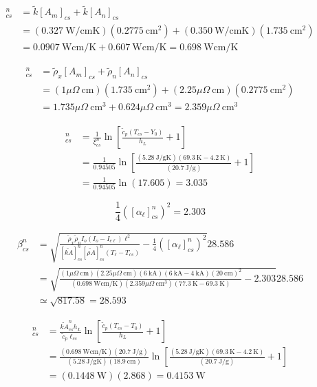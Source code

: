 \begin{align}%
[\tilde{kA}]_{cs}^{n}&=\tilde{k}[A_m]_{cs}+\tilde{k}[A_n]_{cs} \\
&=(0.327\ \mathrm{W/cmK})(0.2775\ \mathrm{cm^2})+(0.350\ \mathrm{W/cmK})(1.735\ \mathrm{cm^2}) \\
&=0.0907\ \mathrm{W cm/K}+0.607\ \mathrm{W cm/K}=0.698\ \mathrm{W cm/K}
\end{align}

\begin{align}%
[\tilde{\rho A}]_{cs}^{n}&=\tilde{\rho}_x[A_m]_{cs}+\tilde{\rho}_n[A_n]_{cs} \\
&=(1\mu\Omega\ \mathrm{cm})(1.735\ \mathrm{cm^2})+(2.25\mu\Omega\ \mathrm{cm})(0.2775\ \mathrm{cm^2}) \\
&=1.735\mu\Omega\ \mathrm{cm^3}+0.624\mu\Omega\ \mathrm{cm^3}=2.359\mu\Omega\ \mathrm{cm^3}
\end{align}

\begin{align}%
[\alpha_\ell]_{cs}^{n}&=\frac{1}{\xi_{cs}^{n}}\ln\left[\frac{\tilde{c}_p(T_{cs}-Y_0)}{h_L}+1\right] \\
&=\frac{1}{0.94505}\ln\left[\frac{(5.28\ \mathrm{J/gK})(69.3\ \mathrm{K}-4.2\ \mathrm{K})}{(20.7\ \mathrm{J/g})}+1\right] \\
&=\frac{1}{0.94505}\ln(17.605)=3.035
\end{align}

\begin{equation}
\frac{1}{4}([\alpha_\ell]_{cs}^{n})^2=2.303
\end{equation}

\begin{align}%
\beta_{cs}^{n}&=\sqrt{\frac{\tilde{\rho}_x\tilde{\rho}_nI_o(I_o-I_{c\ell})\ell^2}{[\tilde{kA}]_{cs}^{n}[\tilde{\rho A}]_{cs}^{n}(T_\ell-T_{cs})}-\frac{1}{4}([\alpha_\ell]_{cs}^{n})^2}
28.586\\
&=\sqrt{\frac{(1\mu\Omega\ \mathrm{cm})(2.25\mu\Omega\ \mathrm{cm})(6\ \mathrm{kA})(6\ \mathrm{kA}-4\ \mathrm{kA})(20\ \mathrm{cm})^2}{(0.698\ \mathrm{W cm/K})(2.359\mu\Omega\ \mathrm{cm^3})(77.3\ \mathrm{K}-69.3\ \mathrm{K})}-2.303}
28.586\\
&\simeq\sqrt{817.58}=28.593
\end{align}

\begin{align}%
[Q_{in}]_{cs}^{n}&=\frac{\tilde{kA}_{cs}^{n}h_L}{\tilde{c}_p\ell_{cs}}\ln\left[\frac{\tilde{c}_p(T_{cs}-T_0)}{h_L}+1\right] \\
&=\frac{(0.698\ \mathrm{W cm/K})(20.7\ \mathrm{J/g})}{(5.28\ \mathrm{J/gK})(18.9\ \mathrm{cm})}\ln\left[\frac{(5.28\ \mathrm{J/gK})(69.3\ \mathrm{K}-4.2\ \mathrm{K})}{(20.7\ \mathrm{J/g})}+1\right] \\
&=(0.1448\ \mathrm{W})(2.868)=0.4153\ \mathrm{W}
\end{align}

